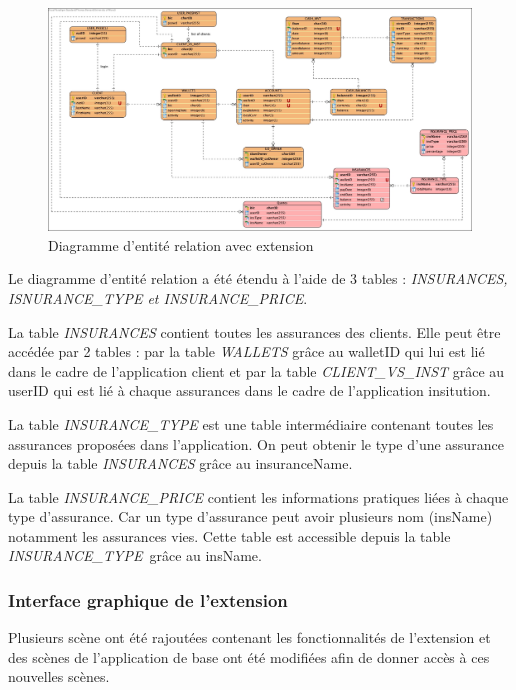\documentclass[../rapport.tex]{subfiles}
\begin{document}
				\begin{figure}[h]
						\centering\includegraphics[scale=0.25]{ressources/photos_diagrammes/extensionThomas/erdThomas.jpg}
						\caption{Diagramme d'entité relation avec extension}
				\end{figure}
		Le diagramme d'entité relation a été étendu à l'aide de 3 tables : \textit{INSURANCES, ISNURANCE\_TYPE et INSURANCE\_PRICE}.
				
		\medskip

		La table \textit{INSURANCES} contient toutes les assurances des clients. Elle peut être accédée par 2 tables : par la table \textit{WALLETS} grâce au walletID qui lui est lié dans le cadre de l'application client et par la table \textit{CLIENT\_VS\_INST} grâce au userID qui est lié à chaque assurances dans le cadre de l'application insitution.

		\medskip

		La table \textit{INSURANCE\_TYPE} est une table intermédiaire contenant toutes les assurances proposées dans l'application. On peut obtenir le type d'une assurance depuis la table \textit{INSURANCES} grâce au insuranceName.

		\medskip

		La table \textit{INSURANCE\_PRICE} contient les informations pratiques liées à chaque type d'assurance. Car un type d'assurance peut avoir plusieurs nom (insName) notamment les assurances vies. Cette table est accessible depuis la table \textit{INSURANCE\_TYPE} grâce au insName.

		\subsubsection{Interface graphique de l'extension}

		Plusieurs scène ont été rajoutées contenant les fonctionnalités de l'extension et des scènes de l'application de base ont été modifiées afin de donner accès à ces nouvelles scènes. 
\end{document}
